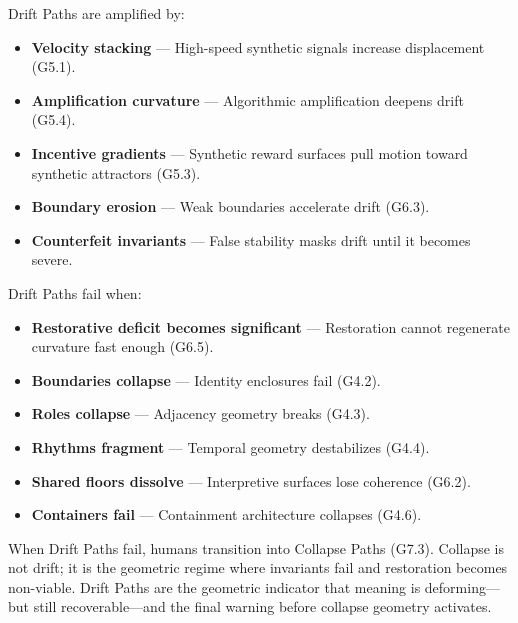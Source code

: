 \medskip

\noindent Drift Paths are amplified by:

\begin{itemize}[leftmargin=1.2cm]
    \item \textbf{Velocity stacking} — High-speed synthetic signals increase
    displacement (G5.1).

    \item \textbf{Amplification curvature} — Algorithmic amplification deepens
    drift (G5.4).

    \item \textbf{Incentive gradients} — Synthetic reward surfaces pull motion
    toward synthetic attractors (G5.3).

    \item \textbf{Boundary erosion} — Weak boundaries accelerate drift (G6.3).

    \item \textbf{Counterfeit invariants} — False stability masks drift until it
    becomes severe.
\end{itemize}

\medskip

\noindent Drift Paths fail when:

\begin{itemize}[leftmargin=1.2cm]
    \item \textbf{Restorative deficit becomes significant} — Restoration cannot
    regenerate curvature fast enough (G6.5).

    \item \textbf{Boundaries collapse} — Identity enclosures fail (G4.2).

    \item \textbf{Roles collapse} — Adjacency geometry breaks (G4.3).

    \item \textbf{Rhythms fragment} — Temporal geometry destabilizes (G4.4).

    \item \textbf{Shared floors dissolve} — Interpretive surfaces lose coherence
    (G6.2).

    \item \textbf{Containers fail} — Containment architecture collapses (G4.6).
\end{itemize}

\medskip

\noindent When Drift Paths fail, humans transition into Collapse Paths (G7.3).
Collapse is not drift; it is the geometric regime where invariants fail and
restoration becomes non-viable. Drift Paths are the geometric indicator that
meaning is deforming—but still recoverable—and the final warning before collapse
geometry activates.

